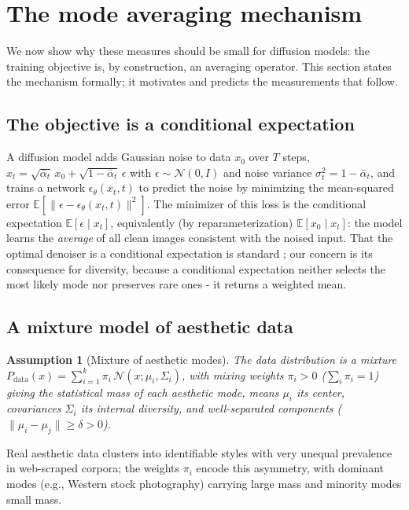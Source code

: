 \documentclass[11pt]{article}
\newtheorem{assumption}{Assumption}
\begin{document}
\section{The mode averaging mechanism}\label{sec:mechanism}

We now show why these measures should be small for diffusion models: the training objective is, by construction, an averaging operator. This section states the mechanism formally; it motivates and predicts the measurements that follow.

\subsection{The objective is a conditional expectation}

A diffusion model \citep{Ho2020, Song2021} adds Gaussian noise to data $x_0$ over $T$ steps, $x_t = \sqrt{\bar{\alpha}_t}\,x_0 + \sqrt{1-\bar{\alpha}_t}\,\epsilon$ with $\epsilon \sim \mathcal{N}(0,I)$ and noise variance $\sigma_t^2 = 1-\bar{\alpha}_t$, and trains a network $\epsilon_\theta(x_t,t)$ to predict the noise by minimizing the mean-squared error $\mathbb{E}[\|\epsilon - \epsilon_\theta(x_t,t)\|^2]$. The minimizer of this loss is the conditional expectation $\mathbb{E}[\epsilon \mid x_t]$, equivalently (by reparameterization) $\mathbb{E}[x_0 \mid x_t]$: the model learns the \emph{average} of all clean images consistent with the noised input. That the optimal denoiser is a conditional expectation is standard \citep{Ho2020}; our concern is its consequence for diversity, because a conditional expectation neither selects the most likely mode nor preserves rare ones - it returns a weighted mean.

\subsection{A mixture model of aesthetic data}

\begin{assumption}[Mixture of aesthetic modes]\label{assum:mixture}
The data distribution is a mixture $P_{\mathrm{data}}(x) = \sum_{i=1}^k \pi_i\,\mathcal{N}(x;\mu_i,\Sigma_i)$, with mixing weights $\pi_i>0$ ($\sum_i \pi_i = 1$) giving the \emph{statistical mass} of each aesthetic mode, means $\mu_i$ its center, covariances $\Sigma_i$ its internal diversity, and well-separated components ($\|\mu_i-\mu_j\|\ge\delta>0$).
\end{assumption}

Real aesthetic data clusters into identifiable styles with very unequal prevalence in web-scraped corpora; the weights $\pi_i$ encode this asymmetry, with dominant modes (e.g., Western stock photography) carrying large mass and minority modes small mass.
\end{document}
